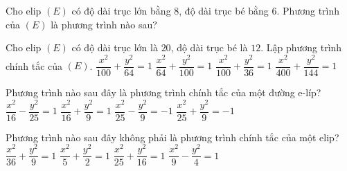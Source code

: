 

\begin{ex}%
	Cho elip $(E)$ có độ dài trục lớn  bằng $8$, độ
	dài trục bé bằng $6$. Phương trình của $(E)$  là
	phương trình nào sau? 
\end{ex}

\begin{ex}%
	Cho elip $(E)$ có độ dài trục lớn là $20$, độ dài trục bé là $12$. Lập phương trình chính tắc  của $(E)$.
	 \choice
		{  $\dfrac{x^2}{100}+\dfrac{y^2}{64}=1$}
		{$\dfrac{x^2}{64}+\dfrac{y^2}{100}=1$} 
		 {\True $\dfrac{x^2}{100}+\dfrac{y^2}{36}=1$}
		 {$\dfrac{x^2}{400}+\dfrac{y^2}{144}=1$}
\end{ex}

\begin{ex}%
	Phương trình nào  sau đây là phương trình chính tắc của một đường e-líp?
	\choice 
		{$\dfrac{x^2}{16}-\dfrac{y^2}{25}=1$} 
		 {\True $\dfrac{x^2}{16}+\dfrac{y^2}{9}=1$}
		 {$\dfrac{x^2}{25}-\dfrac{y^2}{9}=-1$}
		{$\dfrac{x^2}{25}+\dfrac{y^2}{9}=-1$} 
\end{ex}

\begin{ex}%
	Phương trình nào sau đây không phải là phương trình  chính tắc của một elip?
	\choice 
		{$\dfrac{x^2}{36}+\dfrac{y^2}{9}=1$} 
		 {$\dfrac{x^2}{5}+\dfrac{y^2}{2}=1$}
		 {$\dfrac{x^2}{25}+\dfrac{y^2}{16}=1$}
		{\True $\dfrac{x^2}{9}-\dfrac{y^2}{4}=1$} 
\end{ex}


